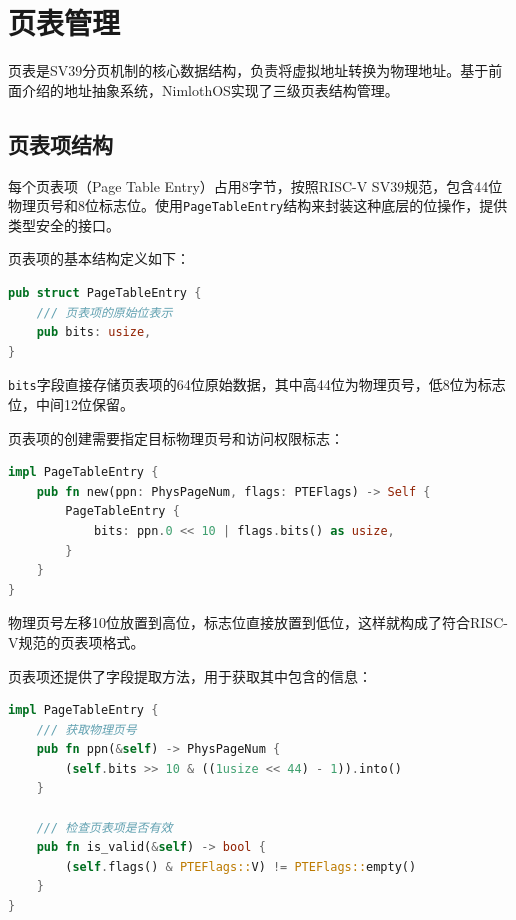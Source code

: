 \section{页表管理}

页表是SV39分页机制的核心数据结构，负责将虚拟地址转换为物理地址。基于前面介绍的地址抽象系统，NimlothOS实现了三级页表结构管理。

\subsection{页表项结构}

每个页表项（Page Table Entry）占用8字节，按照RISC-V SV39规范，包含44位物理页号和8位标志位。使用\lstinline[language=Rust]{PageTableEntry}结构来封装这种底层的位操作，提供类型安全的接口。

页表项的基本结构定义如下：

\begin{lstlisting}[language=Rust,caption={页表项结构}, label={lst:pte-basic}]
pub struct PageTableEntry {
    /// 页表项的原始位表示  
    pub bits: usize,
}
\end{lstlisting}

\lstinline[language=Rust]{bits}字段直接存储页表项的64位原始数据，其中高44位为物理页号，低8位为标志位，中间12位保留。

页表项的创建需要指定目标物理页号和访问权限标志：

\begin{lstlisting}[language=Rust,caption={页表项创建}, label={lst:pte-create}]
impl PageTableEntry {
    pub fn new(ppn: PhysPageNum, flags: PTEFlags) -> Self {
        PageTableEntry {
            bits: ppn.0 << 10 | flags.bits() as usize,
        }
    }
}
\end{lstlisting}

物理页号左移10位放置到高位，标志位直接放置到低位，这样就构成了符合RISC-V规范的页表项格式。

页表项还提供了字段提取方法，用于获取其中包含的信息：

\begin{lstlisting}[language=Rust,caption={页表项字段提取}, label={lst:pte-extract}]
impl PageTableEntry {
    /// 获取物理页号
    pub fn ppn(&self) -> PhysPageNum {
        (self.bits >> 10 & ((1usize << 44) - 1)).into()
    }
    
    /// 检查页表项是否有效
    pub fn is_valid(&self) -> bool {
        (self.flags() & PTEFlags::V) != PTEFlags::empty()
    }
}
\end{lstlisting}

